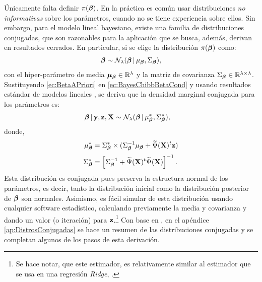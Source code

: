 \documentclass[../Main/Main.tex]{subfiles}
\begin{document}
Únicamente falta definir $\pi(\bm{\beta})$. En la práctica es común usar distribuciones \textit{no informativas} sobre los parámetros, cuando no se tiene experiencia sobre ellos. Sin embargo, para el modelo lineal bayesiano, existe una familia de distribuciones conjugadas, que son razonables para la aplicación que se busca, además, derivan en resultados cerrados. En particular, si se elige la distribución $\pi(\bm{\beta})$ como:
\begin{align}
	\bm{\beta} \sim \mathcal{N}_{\lambda}(\bm{\beta}\,|\,\mu_{\bm{\beta}}, \Sigma_{\bm{\beta}}), \label{ec:BetaAPriori}
\end{align}
con el hiper-parámetro de media $\bm{\mu}_{\bm{\beta}}\in \mathbb{R}^{\lambda}$ y la matriz de covarianza $\Sigma_{\bm{\beta}} \in \mathbb{R}^{\lambda \times \lambda}$. Sustituyendo \eqref{ec:BetaAPriori} en \eqref{ec:BayesChibbBetaCond} y usando resultados estándar de modelos lineales \autocite{banerjee2008gory}, se deriva que la densidad marginal conjugada para los parámetros es:
\begin{align}
	\bm{\beta}\,|\,\mathbf{y},\mathbf{z},\mathbf{X} &\sim \mathcal{N}_{\lambda}(\bm{\beta}\,|\,\mu_{\bm{\beta}}^*, \Sigma_{\bm{\beta}}^*), \label{ec:SimBeta}
\end{align}	
donde,
\begin{align*}
	\mu_{\bm{\beta}}^* &= \Sigma_{\bm{\beta}}^* \times (\Sigma_{\bm{\beta}}^{-1}\mu_{\bm{\beta}} + \widetilde{\Psi}(\mathbf{X})^t\mathbf{z} )\nonumber \\[2pt]
	 \Sigma_{\bm{\beta}}^* &= \left[\Sigma_{\bm{\beta}}^{-1} + \widetilde{\Psi}(\mathbf{X})^t\widetilde{\Psi}(\mathbf{X})\right]^{-1}.\nonumber
\end{align*}	 
Esta distribución es conjugada pues preserva la estructura normal de los parámetros, es decir, tanto la distribución inicial como la distribución posterior de $\bm{\beta}$ son normales. Asimismo, es fácil simular de esta distribución usando cualquier software estadístico, calculando previamente la media y covarianza y dando un valor (o iteración) para $\mathbf{z}$.\footnote{Se hace notar, que este estimador, es relativamente similar al estimador que se usa en una regresión \textit{Ridge}, \autocite{tibshirani1996regression}.} Con base en \citet{banerjee2008gory}, en el apéndice \ref{ap:DistrosConjugadas} se hace un resumen de las distribuciones conjugadas y se completan algunos de los pasos de esta derivación. 
\end{document}
